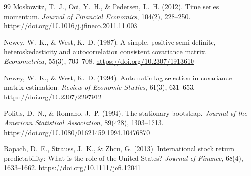 \begin{thebibliography}{99}
Moskowitz, T.~J., Ooi, Y.~H., \& Pedersen, L.~H. (2012). Time series momentum. \textit{Journal of Financial Economics}, 104(2), 228--250. \url{https://doi.org/10.1016/j.jfineco.2011.11.003}

Newey, W.~K., \& West, K.~D. (1987). A simple, positive semi-definite, heteroskedasticity and autocorrelation consistent covariance matrix. \textit{Econometrica}, 55(3), 703--708. \url{https://doi.org/10.2307/1913610}

Newey, W.~K., \& West, K.~D. (1994). Automatic lag selection in covariance matrix estimation. \textit{Review of Economic Studies}, 61(3), 631--653. \url{https://doi.org/10.2307/2297912}

Politis, D.~N., \& Romano, J.~P. (1994). The stationary bootstrap. \textit{Journal of the American Statistical Association}, 89(428), 1303--1313. \url{https://doi.org/10.1080/01621459.1994.10476870}

Rapach, D.~E., Strauss, J.~K., \& Zhou, G. (2013). International stock return predictability: What is the role of the United States? \textit{Journal of Finance}, 68(4), 1633--1662. \url{https://doi.org/10.1111/jofi.12041}

\end{thebibliography}
